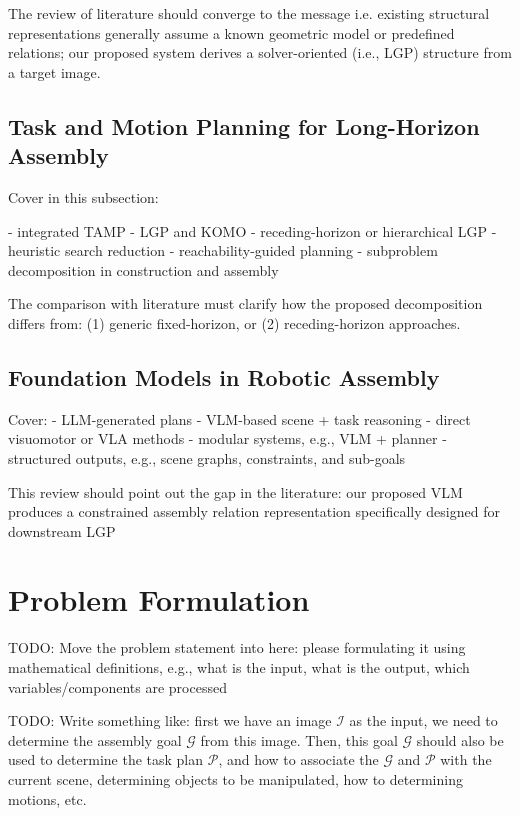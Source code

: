 \documentclass[journal]{IEEEtran}
\newcommand{\todo}[1]{{\color{red}TODO: #1}}
\begin{document}
The review of literature should converge to the message i.e. existing structural representations generally assume a known geometric model or predefined relations; our proposed system derives a solver-oriented (i.e., LGP) structure from a target image.

\subsection{Task and Motion Planning for Long-Horizon Assembly}

Cover in this subsection:

- integrated TAMP
- LGP and KOMO
- receding-horizon or hierarchical LGP
- heuristic search reduction
- reachability-guided planning
- subproblem decomposition in construction and assembly

The comparison with literature must clarify how the proposed decomposition differs from: (1) generic fixed-horizon, or (2) receding-horizon approaches.

\subsection{Foundation Models in Robotic Assembly}

Cover:
- LLM-generated plans
- VLM-based scene + task reasoning
- direct visuomotor or VLA methods
- modular systems, e.g., VLM + planner
- structured outputs, e.g., scene graphs, constraints, and sub-goals

This review should point out the gap in the literature:
our proposed VLM produces a constrained assembly relation representation specifically designed for downstream LGP


\section{Problem Formulation}
\label{sec:problem_formulation}

\todo{Move the problem statement into here: please formulating it using mathematical definitions, e.g., what is the input, what is the output, which variables/components are processed}

\todo{Write something like: first we have an image $\mathcal{I}$ as the input, we need to determine the assembly goal $\mathcal{G}$ from this image. Then, this goal $\mathcal{G}$ should also be used to determine the task plan $\mathcal{P}$, and how to associate the $\mathcal{G}$ and $\mathcal{P}$ with the current scene, determining objects to be manipulated, how to determining motions, etc.}
\end{document}
